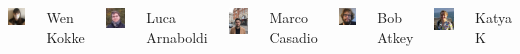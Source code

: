 \documentclass{beamer}
\begin{document}
\begin{frame}
\begin{columns}
   \includegraphics[width=1.6cm]{Images/Wen.png}
   \begin{alertblock}{\footnotesize{Wen Kokke}}
   \end{alertblock}
    \includegraphics[width=1.8cm]{Images/Luca.jpeg}
    \begin{block}{\footnotesize{Luca Arnaboldi}}
   \end{block}
  \includegraphics[width=1.8cm]{Images/Marco.jpg}
        \begin{block}{\footnotesize{Marco Casadio}}
     \end{block}




     \includegraphics[width=1.6cm]{Images/Bob.jpeg}

          \begin{block}{\footnotesize{Bob Atkey}}
     \end{block}

\includegraphics[width=1.8cm]{Images/Katya3.jpg}
\begin{block}{\footnotesize{Katya K}}
   \end{block}



\end{columns}
\end{frame}
\end{document}
